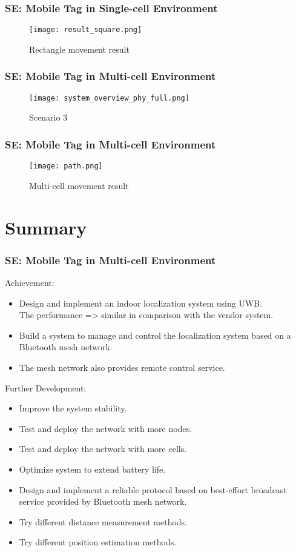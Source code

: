 \documentclass[10pt]{beamer}
\begin{document}
\begin{frame}
    \frametitle{SE: Mobile Tag in Single-cell Environment}
    \begin{figure}[H]
        \centering
        \texttt{[image: result\_square.png]}
        \caption{Rectangle movement result}
        \label{fig:result_rectangle}
    \end{figure}
\end{frame}

\begin{frame}
    \frametitle{SE: Mobile Tag in Multi-cell Environment}
    \begin{figure}[H]
        \centering
        \texttt{[image: system\_overview\_phy\_full.png]}
        \caption{Scenario 3}
        \label{fig:scenario_3}
    \end{figure}
\end{frame}

\begin{frame}
    \frametitle{SE: Mobile Tag in Multi-cell Environment}
    \begin{figure}[H]
        \centering
        \texttt{[image: path.png]}
        \caption{Multi-cell movement result}
        \label{fig:multi_cell_movement_result}
    \end{figure}
\end{frame}

\section{Summary}
\begin{frame}
    \frametitle{SE: Mobile Tag in Multi-cell Environment}
    Achievement:
    \begin{itemize}
        \item Design and implement an indoor localization system using UWB. \\The performance => similar in comparison with the vendor system.
        \item Build a system to manage and control the localization system based on a Bluetooth mesh network.
        \item The mesh network also provides remote control service.
    \end{itemize}
    Further Development:
    \begin{itemize}
        \item Improve the system stability.
        \item Test and deploy the network with more nodes.
        \item Test and deploy the network with more cells.
        \item Optimize system to extend battery life.
        \item Design and implement a reliable protocol based on best-effort broadcast service provided by Bluetooth mesh network.
        \item Try different distance measurement methods.
        \item Try different position estimation methods.
    \end{itemize}
\end{frame}
\end{document}
